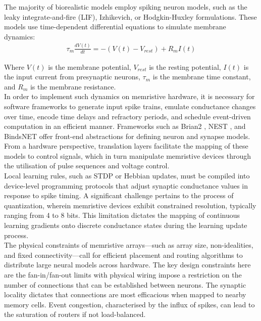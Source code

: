 \noindent The majority of biorealistic models employ spiking neuron models, such as the leaky integrate-and-fire (LIF), Izhikevich, or Hodgkin-Huxley formulations. These models use time-dependent differential equations to simulate membrane dynamics:
\begin{align}
    \tau_m \frac{dV(t)}{dt} = -(V(t) - V_{rest}) + R_mI(t) \label{eq:2.42}
\end{align}

\noindent Where $V(t)$ is the membrane potential, $V_{rest}$ is the resting potential, $I(t)$ is the input current from presynaptic neurons, $\tau_m$ is the membrane time constant, and $R_m$ is the membrane resistance.\\

\noindent In order to implement such dynamics on memristive hardware, it is necessary for software frameworks to generate input spike trains, emulate conductance changes over time, encode time delays and refractory periods, and schedule event-driven computation in an efficient manner. Frameworks such as Brian2 \cite{stimberg2019brian}, NEST \cite{gewaltig2007nest}, and BindsNET \cite{hazan2018bindsnet} offer front-end abstractions for defining neuron and synapse models. From a hardware perspective, translation layers facilitate the mapping of these models to control signals, which in turn manipulate memristive devices through the utilisation of pulse sequences and voltage control. \\

\noindent Local learning rules, such as STDP or Hebbian updates, must be compiled into device-level programming protocols that adjust synaptic conductance values in response to spike timing. A significant challenge pertains to the process of quantization, wherein memristive devices exhibit constrained resolution, typically ranging from 4 to 8 bits. This limitation dictates the mapping of continuous learning gradients onto discrete conductance states during the learning update process.\\

\noindent The physical constraints of memristive arrays—such as array size, non-idealities, and fixed connectivity—call for efficient placement and routing algorithms to distribute large neural models across hardware. The key design constraints here are the fan-in/fan-out limits with physical wiring impose a restriction on the number of connections that can be established between neurons. The synaptic locality dictates that connections are most efficacious when mapped to nearby memory cells. Event congestion, characterised by the influx of spikes, can lead to the saturation of routers if not load-balanced.\\


